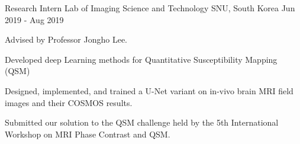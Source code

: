 \begin{cventries}
  \cventry
    {Research Intern} %
    {Lab of Imaging Science and Technology} %
    {SNU, South Korea} %
    {Jun 2019 - Aug 2019} %
    {
      \begin{cvitems} %
        \item {Advised by Professor Jongho Lee.}
        \item {Developed deep Learning methods for Quantitative Susceptibility Mapping (QSM)}
        \item {Designed, implemented, and trained a U-Net variant on in-vivo brain MRI field images and their COSMOS results.}
        \item {Submitted our solution to the QSM challenge held by the 5th International Workshop on MRI Phase Contrast and QSM.}
      \end{cvitems}
    }

\end{cventries}
